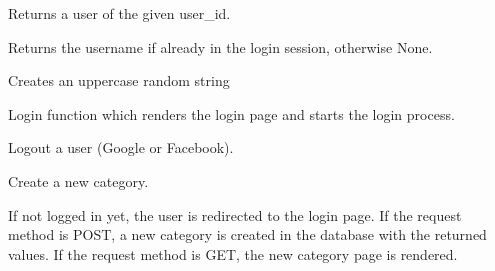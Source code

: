 \documentclass[letterpaper,10pt,english]{sphinxmanual}
\begin{document}

\begin{fulllineitems}
\label{application:application.getUserInfo}
Returns a user of the given user\_id.

\end{fulllineitems}


\begin{fulllineitems}
\label{application:application.getUsername}
Returns the username if already in the
login session, otherwise None.

\end{fulllineitems}


\begin{fulllineitems}
\label{application:application.get_random_string}
Creates an uppercase random string

\end{fulllineitems}


\begin{fulllineitems}
\label{application:application.login}
Login function which renders the login page and
starts the login process.

\end{fulllineitems}


\begin{fulllineitems}
\label{application:application.logout}
Logout a user (Google or Facebook).

\end{fulllineitems}


\begin{fulllineitems}
\label{application:application.newCategory}
Create a new category.

If not logged in yet, the user is redirected to
the login page.
If the request method is POST, a new category is created
in the database with the returned values.
If the request method is GET, the new category page is
rendered.

\end{fulllineitems}
\end{document}
